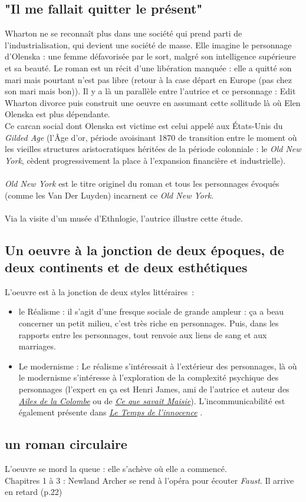 \documentclass[a4paper,12pt]{article}
\newcommand{\lti}{\underline{\textit{Le Temps de l'innocence}} }
\begin{document}
\subsection{"Il me fallait quitter le présent"}
Wharton ne se reconnaît plus dans une société qui prend parti de l'industrialisation, qui devient une société de masse. Elle imagine le personnage d'Olenska : une femme défavorisée par le sort, malgré son intelligence supérieure et sa beauté. Le roman est un récit d'une libération manquée : elle a quitté son mari mais pourtant n'est pas libre (retour à la case départ en Europe (pas chez son mari mais bon)). Il y a là un parallèle entre l'autrice et ce personnage : Edit Wharton divorce puis construit une oeuvre en assumant cette sollitude là où Elen Olenska est plus dépendante.\\
Ce carcan social dont Olenska est victime est celui appelé aux États-Unis du \textit{Gilded Age} (l'Âge d'or, période avoisinant 1870 de transition entre le moment où les vieilles structures aristocratiques héritées de la période colonniale : le \textit{Old New York}, cèdent progressivement la place à l'expansion financière et industrielle).\\\\
\textit{Old New York} est le titre originel du roman et tous les personnages évoqués (comme les Van Der Luyden) incarnent ce \textit{Old New York}.\\\\
Via la visite d'un musée d'Ethnlogie, l'autrice illustre cette étude.

\subsection{Un oeuvre à la jonction de deux époques, de deux continents et de deux esthétiques}

L'oeuvre est à la jonction de deux styles littéraires~:
\begin{itemize}
    \item le Réalisme : il s'agit d'une fresque sociale de grande ampleur : ça a beau concerner un petit milieu, c'est très riche en personnages. Puis, dans les rapports entre les personnages, tout renvoie aux liens de sang et aux marriages.
    \item Le modernisme : Le réalisme s'intéressait à l'extérieur des personnages, là où le modernisme s'intéresse à l'exploration de la complexité psychique des personnages (l'expert en ça est Henri James, ami de l'autrice et auteur des \textit{\underline{Ailes de la Colombe}} ou de \textit{\underline{Ce que savait Maisie}}). L'incommunicabilité est également présente dans \lti.
\end{itemize}



\subsection{un roman circulaire}
L'oeuvre se mord la queue : elle s'achève où elle a commencé.\\
Chapitres 1 à 3 : Newland Archer se rend à l'opéra pour écouter \textit{Faust}. Il arrive en retard (p.22)
\end{document}
